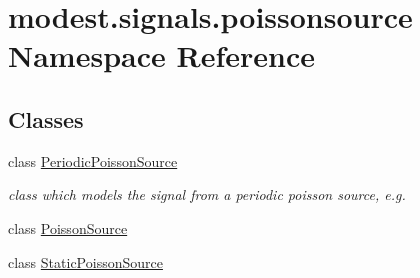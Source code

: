 \hypertarget{namespacemodest_1_1signals_1_1poissonsource}{}\section{modest.\+signals.\+poissonsource Namespace Reference}
\label{namespacemodest_1_1signals_1_1poissonsource}
\subsection*{Classes}
\begin{DoxyCompactItemize}
\item 
class \hyperlink{classmodest_1_1signals_1_1poissonsource_1_1PeriodicPoissonSource}{Periodic\+Poisson\+Source}
\begin{DoxyCompactList}\small\item\em class which models the signal from a periodic poisson source, e.\+g. \end{DoxyCompactList}\item 
class \hyperlink{classmodest_1_1signals_1_1poissonsource_1_1PoissonSource}{Poisson\+Source}
\item 
class \hyperlink{classmodest_1_1signals_1_1poissonsource_1_1StaticPoissonSource}{Static\+Poisson\+Source}
\end{DoxyCompactItemize}
